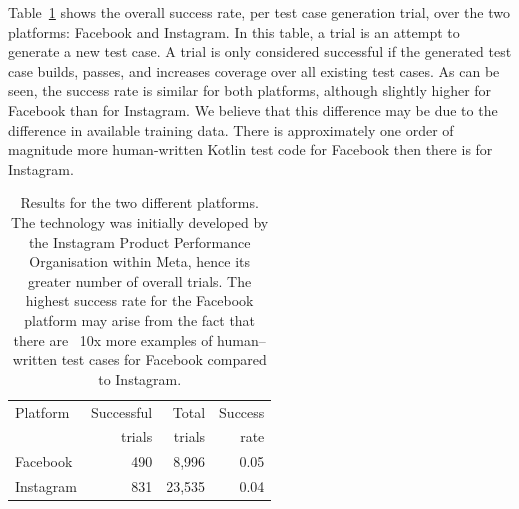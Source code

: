 \documentclass[sigconf,screen]{acmart}
\begin{document}






Table~\ref{tab:platform-ranks} shows the overall success rate, per test case generation trial, over the two platforms: Facebook and Instagram.
In this table, a trial is an attempt to generate a new test case.
A trial is only considered successful if the generated test case builds, passes, and increases coverage over all existing test cases.
As can be seen, the success rate is similar for both platforms, although slightly higher for Facebook than for Instagram.
We believe that this difference may be due to the difference in available training data.
There is approximately one order of magnitude more human-written Kotlin test code for Facebook then there is for Instagram.



\begin{table}
\begin{tabular}{||l | r |  r |  r ||} 
 \hline
Platform      & Successful & Total  & Success \\
              & trials     & trials & rate    \\
\hline              
Facebook      & 490        & 8,996  & 0.05    \\
Instagram     & 831	       & 23,535 & 0.04    \\
 \hline
\end{tabular}
\caption{Results for the two different platforms. The technology was initially developed by the Instagram Product Performance Organisation within Meta, hence its greater number of overall trials. The highest success rate for the Facebook platform may arise from the fact that there are ~10x more examples of human–written test cases for Facebook compared to Instagram. }
\label{tab:platform-ranks}
\end{table}
\end{document}
